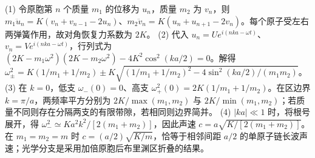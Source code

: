 (1) 令原胞第 \(n\) 个质量 \(m_1\) 的位移为 \(u_n\)，质量 \(m_2\) 为 \(v_n\)，则 \(m_1\ddot u_n=K(v_n+v_{n-1}-2u_n)\)、\(m_2\ddot v_n=K(u_n+u_{n+1}-2v_n)\)。每个原子受左右两弹簧作用，故对角恢复力系数为 \(2K\)。
(2) 代入 \(u_n=Ue^{i(nka-\omega t)}\)、\(v_n=Ve^{i(nka-\omega t)}\)，行列式为 \((2K-m_1\omega^2)(2K-m_2\omega^2)-4K^2\cos^2(ka/2)=0\)。解得 \(\omega_\pm^2=K(1/m_1+1/m_2)\pm K\sqrt{(1/m_1+1/m_2)^2-4\sin^2(ka/2)/(m_1m_2)}\)。
(3) 在 \(k=0\)，低支 \(\omega_-(0)=0\)、高支 \(\omega_+^2(0)=2K(1/m_1+1/m_2)\)。在区边界 \(k=\pi/a\)，两频率平方分别为 \(2K/\max(m_1,m_2)\) 与 \(2K/\min(m_1,m_2)\)；若质量不同则存在分隔两支的有限带隙，若相同则边界简并。
(4) \(|ka|\ll1\) 时，将根号展开，得 \(\omega_-^2\simeq K a^2k^2/[2(m_1+m_2)]\)，因此声速 \(c=a\sqrt{K/[2(m_1+m_2)]}\)。在 \(m_1=m_2=m\) 时 \(c=(a/2)\sqrt{K/m}\)，恰等于相邻间距 \(a/2\) 的单原子链长波声速；光学分支是采用加倍原胞后布里渊区折叠的结果。
